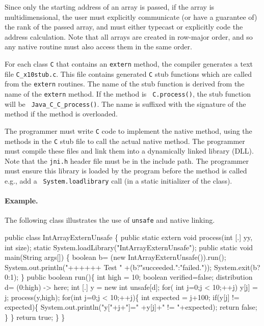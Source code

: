 Since only the starting address of an array is passed, if the array is
multidimensional, the user must explicitly communicate (or have a
guarantee of) the rank of the passed array, and must either typecast
or explicitly code the address calculation.  Note that all \Xten{}
arrays are created in row-major order, and so any native routine must
also access them in the same order.

For each class {\tt C} that contains an {\tt extern} method, the
\Xten{} compiler generates a text file {\tt C\_x10stub.c}.  This file
contains generated {\tt C} stub functions which are called from the
{\tt extern} routines.  The name of the stub function is derived from
the name of the {\tt extern} method. If the method is {\tt
C.process()}, the stub function will be {\tt
Java\_C\_C\_process()}. The name is suffixed with the signature of the
method if the method is overloaded.

The programmer must write {\tt C} code to implement the native method,
using the methods in the {\tt C} stub file to call the actual native
method.  The programmer must compile these files and link them into a
dynamically linked library (DLL).  Note that the {\tt jni.h} header file
must be in the include path.  The programmer must ensure this library
is loaded by the program before the method is called e.g., add a {\tt
System.loadlibrary} call (in a static initializer of the
\Xten{} class).

\paragraph{Example.}
The following class illustrates the use of {\tt unsafe} and native
linking. 
\begin{x10}
public class IntArrayExternUnsafe \{
  public static extern 
      void process(int [.] yy, int size);
  static {System.loadLibrary("IntArrayExternUnsafe");}
  public static void main(String args[]) \{
     boolean b= (new IntArrayExternUnsafe()).run();
     System.out.println("++++++ Test "
                         +(b?"succeeded.":"failed."));
     System.exit(b?0:1);
  \}
  public boolean run()\{
    int high = 10;
    boolean verified=false;
    distribution d= (0:high) -> here;
    int [.] y = new int unsafe[d]; 
    for( int j=0;j < 10;++j)
        y[j] = j;
    process(y,high);
    for(int j=0;j < 10;++j)\{
      int expected = j+100;
      if(y[j] != expected)\{
        System.out.println("y["+j+"]="
                           +y[j]+" != "+expected);
        return false;
       \}
    \}
    return true;
  \}
\}
\end{x10}

